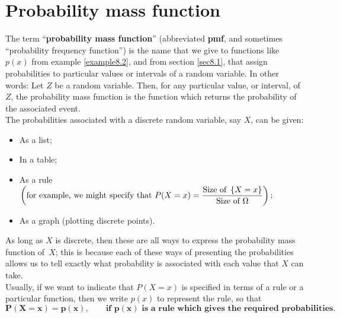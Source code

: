 \section{Probability mass function} \label{pmf}
The term ``\textbf{probability mass function}'' (abbreviated \textbf{pmf}, and sometimes ``probability frequency function'') is the name that we give to functions like $p(x)$ from example \ref{example8.2}, and from section \ref{sec8.1}, that assign probabilities to particular values or intervals of a random variable. In other words: Let $Z$ be a random variable. Then, for any particular value, or interval, of $Z$, the probability mass function is the function which returns the probability of the associated event. \\

\noindent The probabilities associated with a discrete random variable, say $X$, can be given:
\begin{itemize}
\item As a list; \smallskip
\item In a table;
\item As a rule $\left(\text{for example, we might specify that }\displaystyle{P(X = x) = \frac{\text{Size of }\left\{X=x\right\}}{\text{Size of }\Omega}}\right);$
\item As a graph (plotting discrete points).
\end{itemize}
As long as $X$ is discrete, then these are all ways to express the probability mass function of~$X$; this is because each of these ways of presenting the probabilities allows us to tell exactly what probability is associated with each value that $X$ can take. \\

\noindent Usually, if we want to indicate that $P(X = x)$ is specified in terms of a rule or a particular function, then we write $p(x)$ to represent the rule, so that \label{symbp(x)}
\[
\boldsymbol{P(X = x) = p(x), \qquad \text{if $p(x)$ is a rule which gives the required probabilities.}}
\]

